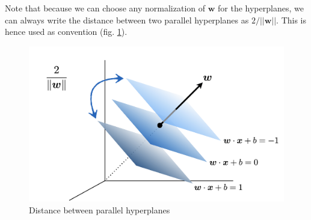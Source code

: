 \documentclass[11pt]{article}
\begin{document}
Note that because we can choose any normalization of $\mathbf{w}$ for the hyperplanes, we can always write the distance between two parallel hyperplanes as $2/||\mathbf{w}||$. This is hence used as convention (fig. \ref{fig:2}).
\begin{figure}[!t]
    \centering
    \includegraphics[width=0.5\linewidth]{images/Distance_between_hyperplanes.png}
    \caption{Distance between parallel hyperplanes}
    \label{fig:2}
\end{figure}
\end{document}
